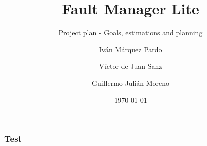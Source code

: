 \documentclass[10pt, compress]{beamer}
\title{Fault Manager Lite}
\subtitle{Project plan - Goals, estimations and planning}
\date{\today}
\author{Iván Márquez Pardo \and Víctor de Juan Sanz \and Guillermo Julián Moreno}
\institute{Triforce}
\begin{document}
\maketitle

\begin{frame}[fragile]
\frametitle{Test}
\end{frame}
\end{document}
